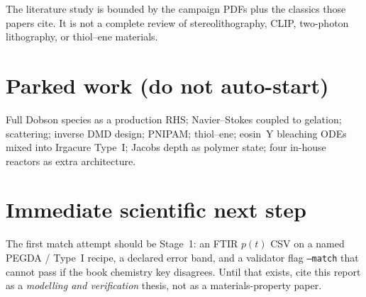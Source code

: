 The literature study is bounded by the campaign PDFs plus the classics those papers cite.
It is not a complete review of stereolithography, CLIP, two-photon lithography, or thiol--ene materials.

\section{Parked work (do not auto-start)}

Full Dobson species as a production RHS; Navier--Stokes coupled to gelation; scattering; inverse DMD design; PNIPAM; thiol--ene; eosin~Y bleaching ODEs mixed into Irgacure Type~I; Jacobs depth as polymer state; four in-house reactors as extra architecture.

\section{Immediate scientific next step}

The first match attempt should be Stage~1: an FTIR $p(t)$ CSV on a named PEGDA / Type~I recipe, a declared error band, and a validator flag \texttt{--match} that cannot pass if the book chemistry key disagrees.
Until that exists, cite this report as a \emph{modelling and verification} thesis, not as a materials-property paper.
